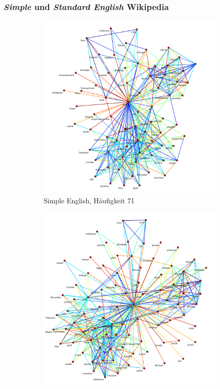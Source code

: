 \documentclass[11pt, a4paper]{article}
\begin{document}
\pagebreak
\subsubsection{\emph{Simple} und \emph{Standard English} Wikipedia}

\begin{figure}[hp!]
    \centering
    \begin{subfigure}[b]{0.5\textwidth}
        \includegraphics[scale=.25]{../../data/results/cooc_wiki_sim/topwords-t0005/graph_born.pdf}
        \caption{Simple English, Häufigkeit 71}
    \end{subfigure}
    \begin{subfigure}[b]{0.5\textwidth}
        \includegraphics[scale=.25]{../../data/results/cooc_wiki_en/topwords-t0005/graph_born.pdf}

\end{subfigure}
\end{figure}
\end{document}
